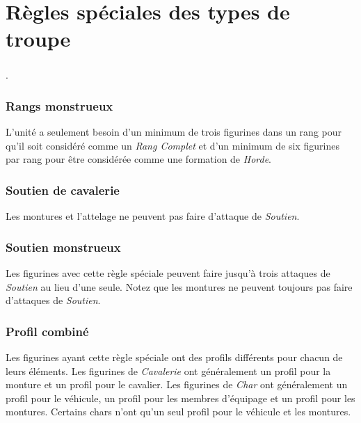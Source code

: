 \section{Règles spéciales des types de troupe}

\subsubsection*{}

.

\subsubsection*{Rangs monstrueux}

L'unité a seulement besoin d'un minimum de trois figurines dans un rang pour qu'il soit considéré comme un \emph{Rang Complet} et d'un minimum de six figurines par rang pour être considérée comme une formation de \emph{Horde}.

\subsubsection*{Soutien de cavalerie}

Les montures et l'attelage ne peuvent pas faire d'attaque de \emph{Soutien}.

\subsubsection*{Soutien monstrueux}

Les figurines avec cette règle spéciale peuvent faire jusqu'à trois attaques de \emph{Soutien} au lieu d'une seule. Notez que les montures ne peuvent toujours pas faire d'attaques de \emph{Soutien}.

\subsubsection*{Profil combiné}

Les figurines ayant cette règle spéciale ont des profils différents pour chacun de leurs éléments. Les figurines de \emph{Cavalerie} ont généralement un profil pour la monture et un profil pour le cavalier. Les figurines de \emph{Char} ont généralement un profil pour le véhicule, un profil pour les membres d'équipage et un profil pour les montures. Certains chars n'ont qu'un seul profil pour le véhicule et les montures.

